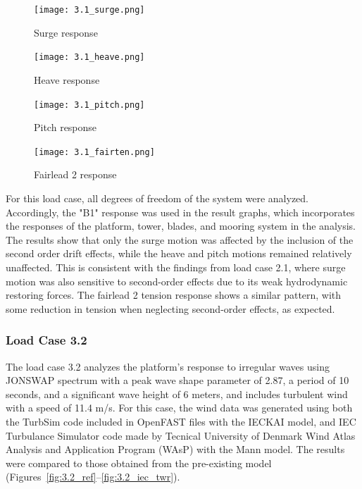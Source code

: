 \documentclass[a4paper, 11pt]{article}
\begin{document}
\begin{figure}[H]
    \begin{minipage}{0.48\textwidth}
        \centering
        \texttt{[image: 3.1\_surge.png]}
        \caption{\small Surge response}
        \label{fig:3.1_surge}
    \end{minipage}
    \hfill
    \begin{minipage}{0.48\textwidth}
        \centering
        \texttt{[image: 3.1\_heave.png]}
        \caption{\small Heave response}
        \label{fig:3.1_heave}
    \end{minipage}
\end{figure}

\begin{figure}[H]
    \begin{minipage}{0.48\textwidth}
        \centering
        \texttt{[image: 3.1\_pitch.png]}
        \caption{\small Pitch response}
        \label{fig:3.1_pitch}
    \end{minipage}
    \hfill
    \begin{minipage}{0.48\textwidth}
        \centering
        \texttt{[image: 3.1\_fairten.png]}
        \caption{\small Fairlead 2 response}
        \label{fig:3.1_fairten}
    \end{minipage}
\end{figure}

For this load case, all degrees of freedom of the system were analyzed. Accordingly, the "B1" response was used in the result graphs, which incorporates the responses of the platform, tower, blades, and mooring system in the analysis. The results show that only the surge motion was affected by the inclusion of the second order drift effects, while the heave and pitch motions remained relatively unaffected. This is consistent with the findings from load case 2.1, where surge motion was also sensitive to second-order effects due to its weak hydrodynamic restoring forces. The fairlead 2 tension response shows a similar pattern, with some reduction in tension when neglecting second-order effects, as expected.

\subsubsection{Load Case 3.2}  
\hspace*{0.5cm}The load case 3.2 analyzes the platform’s response to irregular waves using JONSWAP spectrum with a peak wave shape parameter of 2.87, a period of 10 seconds, and a significant wave height of 6 meters, and includes turbulent wind with a speed of 11.4 m/s. For this case, the wind data was generated using both the TurbSim code included in OpenFAST files with the IECKAI model, and IEC Turbulance Simulator code made by Tecnical University of Denmark Wind Atlas Analysis and Application Program (WAsP) with the Mann model. The results were compared to those obtained from the pre-existing model (Figures~\ref{fig:3.2_ref}--\ref{fig:3.2_iec_twr}).
\end{document}
